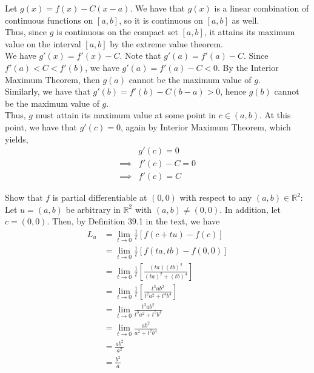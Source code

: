 \documentclass[12pt]{article}
\newenvironment{problem}[2][Problem]{\begin{trivlist}
\item[\hskip \labelsep {\bfseries #1}\hskip \labelsep {\bfseries #2.}]}{\end{trivlist}}
\begin{document}
\begin{problem}{2}
\end{problem}

Let $g(x) = f(x) - C(x - a)$. We have that $g(x)$ is a linear combination of continuous functions on $[a, b]$, so it is continuous on $[a, b]$ as well.\\

Thus, since $g$ is continuous on the compact set $[a, b]$, it attains its maximum value on the interval $[a, b]$ by the extreme value theorem.\\

We have $g'(x) = f'(x) - C$. Note that $g'(a) = f'(a) - C$. Since $f'(a) < C < f'(b)$, we have $g'(a) = f'(a) - C < 0$. By the Interior Maximum Theorem, then $g(a)$ cannot be the maximum value of $g$.\\

Similarly, we have that $g'(b) = f'(b) - C(b-a) > 0$, hence $g(b)$ cannot be the maximum value of $g$.\\

Thus, $g$ must attain its maximum value at some point in $c \in (a, b)$. At this point, we have that $g'(c) = 0$, again by Interior Maximum Theorem, which yields,
\begin{align*}
&g'(c) = 0\\
\implies &f'(c) - C = 0\\
\implies &f'(c) = C
\end{align*}

\begin{problem}{3}
\end{problem}

Show that $f$ is partial differentiable at $(0, 0)$ with respect to any $(a, b) \in \mathbb{R}^2$:\\

Let $u = (a, b)$ be arbitrary in $\mathbb{R}^2$ with $(a, b) \neq (0, 0)$. In addition, let $c = (0, 0)$. Then, by Definition 39.1 in the text, we have
\begin{align*}
L_u &= \lim_{t \to 0} \frac{1}{t} [f(c + tu) - f(c)]\\
&= \lim_{t \to 0} \frac{1}{t} [f(ta, tb) - f(0, 0)]\\
&= \lim_{t \to 0} \frac{1}{t} \left[\frac{(ta)(tb)^2}{(ta)^2 + (tb)^4}\right]\\
&= \lim_{t \to 0} \frac{1}{t} \left[\frac{t^3ab^2}{t^2a^2 + t^4b^4}\right]\\
&= \lim_{t \to 0} \frac{t^3ab^2}{t^3a^2 + t^5b^4}\\
&= \lim_{t \to 0} \frac{ab^2}{a^2 + t^2b^4}\\
&= \frac{ab^2}{a^2}\\
&= \frac{b^2}{a}
\end{align*}
\end{document}
